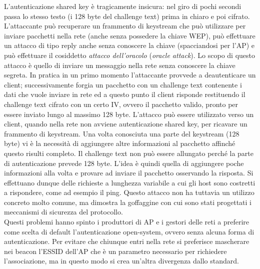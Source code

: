 L'autenticazione shared key è tragicamente insicura: nel giro di pochi secondi passa lo stesso testo (i 128 byte del challenge text) prima in chiaro e poi cifrato. L'attaccante può recuperare un frammento di keystream che può utilizzare per inviare pacchetti nella rete (anche senza possedere la chiave WEP), può effettuare un attacco di tipo reply anche senza conoscere la chiave (spacciandosi per l'AP) e può effettuare il cosiddetto \textit{attacco dell'oracolo} (\textit{oracle attack}). Lo scopo di questo attacco è quello di inviare un messaggio nella rete senza conoscere la chiave segreta. In pratica in un primo momento l'attaccante provvede a deautenticare un client; successivamente forgia un pacchetto con un challenge text contenente i dati che vuole inviare in rete ed a questo punto il client risponde restituendo il challenge text cifrato con un certo IV, ovvero il pacchetto valido, pronto per essere inviato lungo al massimo 128 byte. L'attacco può essere utilizzato verso un client, quando nella rete non avviene autenticazione shared key, per ricavare un frammento di keystream. Una volta conosciuta una parte del keystream (128 byte) vi è la necessità di aggiungere altre informazioni al pacchetto affinché questo risulti completo. Il challenge text non può essere allungato perché la parte di autenticazione prevede 128 byte. L'idea è quindi quella di aggiungere poche informazioni alla volta e provare ad inviare il pacchetto osservando la risposta. Si effettuano dunque delle richieste a lunghezza variabile a cui gli host sono costretti a rispondere, come ad esempio il ping. Questo attacco non ha tuttavia un utilizzo concreto molto comune, ma dimostra la goffaggine con cui sono stati progettati i meccanismi di sicurezza del protocollo.\\

Questi problemi hanno spinto i produttori di AP e i gestori delle reti a preferire come scelta di default l'autenticazione open-system, ovvero senza alcuna forma di autenticazione. Per evitare che chiunque entri nella rete si preferisce mascherare nei beacon l'ESSID dell'AP che è un parametro necessario per richiedere l'associazione, ma in questo modo si crea un'altra divergenza dallo standard.\\

